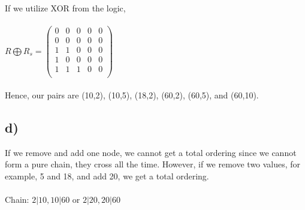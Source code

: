 \documentclass[12pt]{article}
\begin{document}
If we utilize XOR from the logic,\\\\

$R \bigoplus R_s = 
\begin{pmatrix} 
0&0&0&0&0\\
0&0&0&0&0\\
1&1&0&0&0\\ 
1&0&0&0&0\\
1&1&1&0&0\\
\end{pmatrix}$\\\\

Hence, our pairs are (10,2), (10,5), (18,2), (60,2), (60,5), and (60,10).

\subsection*{d) }

If we remove and add one node, we cannot get a total ordering since we cannot form a pure chain, they cross all the time. However, if we remove two values, for example, 5 and 18, and add 20, we get a total ordering.\\\\

Chain:
$2|10, 10|60$ or $2|20, 20|60$ 
\end{document}
